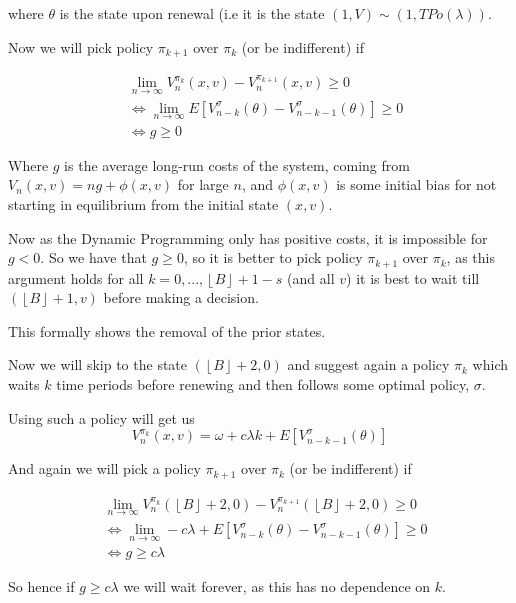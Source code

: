 \documentclass[a4paper,10pt]{article}
\newcommand{\floor}[1]{\left \lfloor #1 \right \rfloor}
\theoremstyle{definition}
\theoremstyle{definition}
\theoremstyle{remark}
\theoremstyle{definition}
\begin{document}
where $\theta$ is the state upon renewal (i.e it is the state $(1,V) \sim (1,TPo(\lambda))$.

Now we will pick policy $\pi_{k+1}$ over $\pi_{k}$ (or be indifferent) if

\begin{align*}
&\lim\limits_{n \rightarrow \infty} V_{n}^{\pi_{k}} (x,v) - V_{n}^{\pi_{k+1}}(x,v) \geq 0 \\
& \iff \lim\limits_{n \rightarrow \infty} E[V_{n-k}^{\sigma}(\theta) - V_{n-k-1}^{\sigma} (\theta)] \geq 0 \\
& \iff g \geq 0
\end{align*}

Where $g$ is the average long-run costs of the system, coming from $V_{n}(x,v)=ng + \phi(x,v)$ for large $n$, and $\phi(x,v)$ is some initial bias for not starting in equilibrium from the initial state $(x,v)$.

Now as the Dynamic Programming only has positive costs, it is impossible for $g < 0$. So we have that $g \geq 0$, so it is better to pick policy $\pi_{k+1}$ over $\pi_{k}$, as this argument holds for all $k=0,...,\floor{B}+1-s$ (and all $v$) it is best to wait till $(\floor{B}+1,v)$ before making a decision.

This formally shows the removal of the prior states.

Now we will skip to the state $(\floor{B}+2,0)$ and suggest again a policy $\pi_{k}$ which waits $k$ time periods before renewing and then follows some optimal policy, $\sigma$.

Using such a policy will get us
\begin{equation}
V_{n}^{\pi_{k}}(x,v)= \omega +c \lambda k + E[V_{n-k-1}^{\sigma}(\theta)]
\end{equation}

And again we will pick a policy $\pi_{k+1}$ over $\pi_{k}$ (or be indifferent) if

\begin{align*}
&\lim\limits_{n \rightarrow \infty} V_{n}^{\pi_{k}} (\floor{B}+2,0) - V_{n}^{\pi_{k+1}}(\floor{B}+2,0) \geq 0 \\
& \iff \lim\limits_{n \rightarrow \infty} -c \lambda + E[V_{n-k}^{\sigma}(\theta) - V_{n-k-1}^{\sigma}(\theta)] \geq 0 \\
& \iff g \geq c \lambda
\end{align*}

So hence if $g \geq c \lambda$ we will wait forever, as this has no dependence on $k$.
\end{document}
